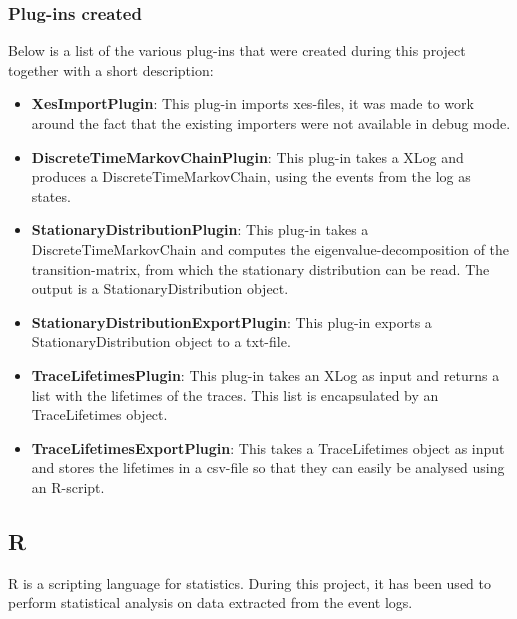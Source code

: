 \subsubsection{Plug-ins created}
Below is a list of the various plug-ins that were created during this project together with a short description:
\begin{itemize}
\item \textbf{XesImportPlugin}: This plug-in imports xes-files, it was made to work around the fact that the existing importers were not available in debug mode.
\item \textbf{DiscreteTimeMarkovChainPlugin}: This plug-in takes a XLog and produces a DiscreteTimeMarkovChain, using the events from the log as states.
\item \textbf{StationaryDistributionPlugin}: This plug-in takes a DiscreteTimeMarkovChain and computes the eigenvalue-decomposition of the transition-matrix, from which the stationary distribution can be read. The output is a StationaryDistribution object.
\item \textbf{StationaryDistributionExportPlugin}: This plug-in exports a StationaryDistribution object to a txt-file.
\item \textbf{TraceLifetimesPlugin}: This plug-in takes an XLog as input and returns a list with the lifetimes of the traces. This list is encapsulated by an TraceLifetimes object.
\item \textbf{TraceLifetimesExportPlugin}: This takes a TraceLifetimes object as input and stores the lifetimes in a csv-file so that they can easily be analysed using an R-script.
\end{itemize}

\subsection{R}
R is a scripting language for statistics. During this project, it has been used to perform statistical analysis on data extracted from the event logs.